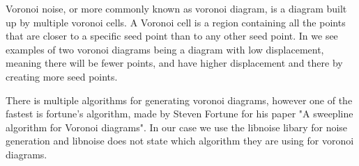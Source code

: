Voronoi noise, or more commonly known as voronoi diagram, is a diagram built up by multiple voronoi cells. A Voronoi cell is a region containing all the points that are closer to a specific seed point than to any other seed point\cite{libnoiseVoronoi}. In  we see examples of two voronoi diagrams  being a diagram with low displacement, meaning there will be fewer points, and  have higher displacement and there by creating more seed points.

There is multiple algorithms for generating voronoi diagrams, however one of the fastest is fortune's algorithm, made by Steven Fortune for his paper "A sweepline algorithm for Voronoi diagrams"\cite{VoronoiSweepLine}. In our case we use the libnoise libary for noise generation and libnoise does not state which algorithm they are using for voronoi diagrams.

